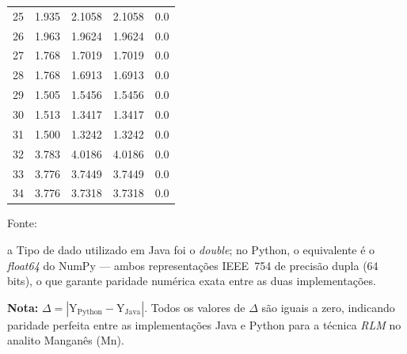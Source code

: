 \begin{table}[H]
\begin{threeparttable}
{\begin{tabular}{
    S[table-format=2.0]
    S[table-format=2.3]
    S[table-format=2.4]
    S[table-format=2.4]
    S[table-format=1.1]
}
25  &  1.935  &  2.1058  &  2.1058  & 0.0 \\
26  &  1.963  &  1.9624  &  1.9624  & 0.0 \\
27  &  1.768  &  1.7019  &  1.7019  & 0.0 \\
28  &  1.768  &  1.6913  &  1.6913  & 0.0 \\
29  &  1.505  &  1.5456  &  1.5456  & 0.0 \\
30  &  1.513  &  1.3417  &  1.3417  & 0.0 \\
31  &  1.500  &  1.3242  &  1.3242  & 0.0 \\
32  &  3.783  &  4.0186  &  4.0186  & 0.0 \\
33  &  3.776  &  3.7449  &  3.7449  & 0.0 \\
34  &  3.776  &  3.7318  &  3.7318  & 0.0 \\
\bottomrule
\end{tabular}%
}
\begin{center}
\begin{minipage}{0.85\linewidth}
\begin{tablenotes}
\footnotesize
\item Fonte:~\oautor
\item[a] Tipo de dado utilizado em Java foi o \textit{double}; no Python,
o equivalente é o \textit{float64} do NumPy — ambos representações IEEE~754
de precisão dupla (64 bits), o que garante paridade numérica exata entre as
duas implementações.
\item \textbf{Nota:} $\Delta = |\text{Y}_{\text{Python}} - \text{Y}_{\text{Java}}|$.
Todos os valores de $\Delta$ são iguais a zero, indicando paridade
perfeita entre as implementações Java e Python para a técnica \textit{RLM}
no analito Manganês (Mn).
\end{tablenotes}
\end{minipage}
\end{center}
\end{threeparttable}
\end{table}

